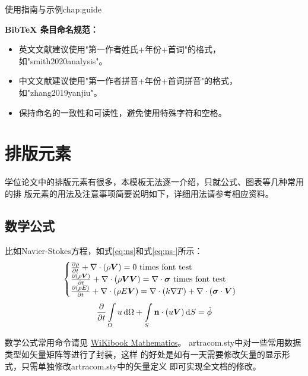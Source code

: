 \begin{cuzchapter}{使用指南与示例}{chap:guide}
\begin{leftbar}
        \noindent\textbf{BibTeX 条目命名规范：}
        \begin{itemize}
            \item 英文文献建议使用"第一作者姓氏+年份+首词"的格式，如"smith2020analysis"。
            \item 中文文献建议使用"第一作者拼音+年份+首词拼音"的格式，如"zhang2019yanjiu"。
            \item 保持命名的一致性和可读性，避免使用特殊字符和空格。
        \end{itemize}
    \end{leftbar}

    \section{排版元素}\label{sec:elements}

    学位论文中的排版元素有很多，本模板无法逐一介绍，只就公式、图表等几种常用的排
    版元素的用法及注意事项简要说明如下，详细用法请参考相应资料。

    \subsection{数学公式}\label{sub:equations}

    比如Navier-Stokes方程，如式\eqref{eq:ns}和式\eqref{eq:ns-}所示：
    \begin{equation}
        \label{eq:ns}
        \begin{cases}
            \frac{\partial \rho}{\partial t} + \nabla\cdot(\rho\Vector{V}) = 0 \ \mathrm{times\ font\ test}                                            \\
            \frac{\partial (\rho\Vector{V})}{\partial t} + \nabla\cdot(\rho\Vector{V}\Vector{V}) = \nabla\cdot\Tensor{\sigma} \ \text{times font test} \\
            \frac{\partial (\rho E)}{\partial t} + \nabla\cdot(\rho E\Vector{V}) = \nabla\cdot(k\nabla T) + \nabla\cdot(\Tensor{\sigma}\cdot\Vector{V})
        \end{cases}
    \end{equation}
    \begin{equation}
        \label{eq:ns-}
        \frac{\partial }{\partial t}\int\limits_{\Omega} u \, \mathrm{d}\Omega + \int\limits_{S} \boldsymbol{\mathbf{n}}\cdot(u\boldsymbol{V}) \, \mathrm{d}S = \dot{\phi}
    \end{equation}

    数学公式常用命令请见
    \href{https://en.wikibooks.org/wiki/LaTeX/Mathematics}{WiKibook
        Mathematics}。 artracom.sty中对一些常用数据类型如矢量矩阵等进行了封装，这样
    的好处是如有一天需要修改矢量的显示形式，只需单独修改artracom.sty中的矢量定义
    即可实现全文档的修改。


\end{cuzchapter}
